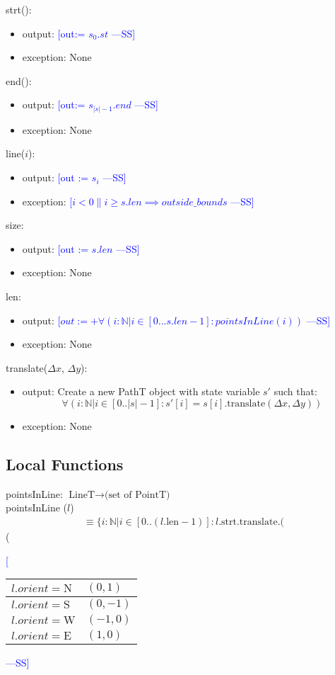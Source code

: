 \documentclass[12pt]{article}
\newcommand{\authornote}[3]{\textcolor{#1}{[#3 ---#2]}}
\newcommand{\authornote}[3]{}
\newcommand{\wss}[1]{\authornote{blue}{SS}{#1}}
\begin{document}
\noindent strt():
\begin{itemize}
\item output: \wss{out:= $s_{0}.st$}
\item exception: None
\end{itemize}

\noindent end():
\begin{itemize}
\item output: \wss{out:= $s_{|s|-1}.end$}
\item exception: None
\end{itemize}

\noindent line($i$):
\begin{itemize}
\item output: \wss{out := $s_{i}$}
\item exception: \wss{$i < 0 \| i \geq s.len \implies outside\_bounds$}
\end{itemize}

\noindent size:
\begin{itemize}
\item output: \wss{out := $s.len$}
\item exception: None
\end{itemize}

\noindent len:
\begin{itemize}
\item output: \wss{$out := +\forall(i : \mathbb{N}|i\in[0...s.len-1] : pointsInLine(i))$}
\item exception: None
\end{itemize}

\noindent translate($\Delta x$, $\Delta y$):
\begin{itemize}
\item output: Create a new PathT object with state variable $s'$ such that:
$$\forall(i: \mathbb{N} | i \in [0..|s|-1] : s'[i] = s[i].\mbox{translate}(\Delta x, \Delta y))$$
\item exception: None
\end{itemize}

\subsection*{Local Functions}

pointsInLine: $\mbox{LineT} \rightarrow \mbox{(set of PointT)}$\\

\noindent pointsInLine ($l$) 
\begin{multline*}
\equiv \{ i: \mathbb{N} | i \in [0
  .. (l.\mbox{len} - 1)] : l.\mbox{strt}.\mbox{translate}.(
\end{multline*} (\wss{\begin{tabular}{|l|l|}
\hline
$l.orient = \mbox{N}$ & $(0,1)$\\
\hline
$l.orient = \mbox{S}$ & $(0,-1)$\\
\hline
$l.orient = \mbox{W}$ & $(-1,0)$\\
\hline
$l.orient = \mbox{E}$ & $(1,0)$\\
\hline
\end{tabular}}
\end{document}
